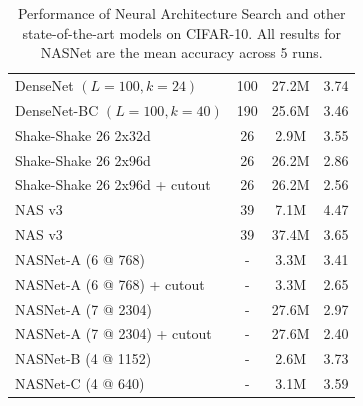 \begin{table}[h!]
\begin{tabular}{l|cc|c}
DenseNet $(L=100, k=24)$ \cite{Huang2016Densely} & 100 & 27.2M &  3.74  \\ 
DenseNet-BC $(L=100, k=40)$ \cite{Huang2016Densely} & 190 & 25.6M &  3.46  \\
\midrule
Shake-Shake 26 2x32d \cite{gastaldi17shakeshake} & 26 & 2.9M & 3.55 \\
Shake-Shake 26 2x96d \cite{gastaldi17shakeshake} & 26 & 26.2M & 2.86 \\
Shake-Shake 26 2x96d + cutout \cite{devries2017improved} & 26 & 26.2M & 2.56 \\
\midrule
NAS v3 \cite{zoph2017neural}& 39 & 7.1M & 4.47  \\
NAS v3 \cite{zoph2017neural}& 39 & 37.4M & 3.65 \\
\midrule
NASNet-A \;(6 @ 768) & - & 3.3M & 3.41 \\
NASNet-A \;(6 @ 768) + cutout & - & 3.3M & 2.65 \\
NASNet-A \;(7 @ 2304) & - & 27.6M & 2.97 \\
NASNet-A \;(7 @ 2304) + cutout & - & 27.6M & 2.40 \\
NASNet-B \;(4 @ 1152) & - & 2.6M & 3.73 \\
NASNet-C \;(4 @ 640) & - & 3.1M & 3.59 \\
\bottomrule
\end{tabular}
\vspace{0.2cm}
\caption{Performance of Neural Architecture Search and other state-of-the-art models on CIFAR-10. All results for NASNet are the mean accuracy across 5 runs.}
\label{tab:cifar10}
\end{table}

